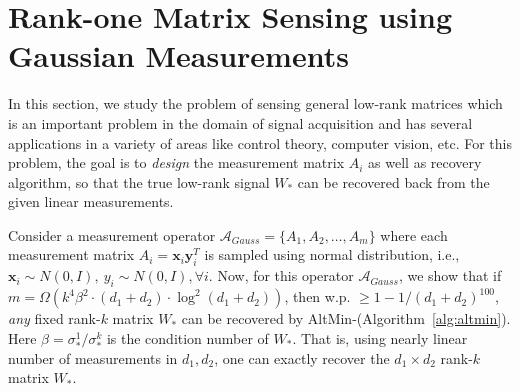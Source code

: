 \documentclass[11pt]{article}
\newcommand{\calN}{{\cal N}}
\newcommand{\calA}{\mathcal{A}}
\newcommand{\so}{\sigma_*}
\newcommand{\Wo}{W_*}
\newcommand{\x}{\bm{x}}
\newcommand{\y}{\bm{y}}
\begin{document}
\section{Rank-one Matrix Sensing using Gaussian Measurements}\label{sec:sense}
In this section, we study the problem of sensing general low-rank  matrices which is an important problem in the domain of signal acquisition \cite{RechtFP2007} and has several applications in a variety of areas like control theory, computer vision, etc.  For this problem, the goal is to {\em design} the measurement matrix $A_i$ as well as recovery algorithm, so that the true low-rank signal $\Wo$ can be  recovered back from the given linear measurements. 

Consider a measurement operator $\calA_{Gauss}=\{A_1, A_2, \dots, A_m\}$ where each measurement matrix $A_i=\x_i\y_i^T$ is sampled using normal distribution, i.e., $\x_i \sim N(0, I),\ y_i\sim N(0, I), \forall i$. Now, for this operator $\calA_{Gauss}$, we show that if $m=\Omega(k^4 \beta^2 \cdot (d_1+d_2) \cdot \log^2(d_1+d_2))$, then w.p. $\geq 1-1/(d_1+d_2)^{100}$,  {\em any} fixed rank-$k$ matrix $\Wo$ can be recovered by  AltMin-\lrrom (Algorithm~\ref{alg:altmin}). Here $\beta=\so^1/\so^k$ is the condition number of $\Wo$. That is, using  nearly linear number of measurements in $d_1, d_2$, one can exactly recover the $d_1\times d_2$ rank-$k$ matrix $\Wo$. 

\end{document}
